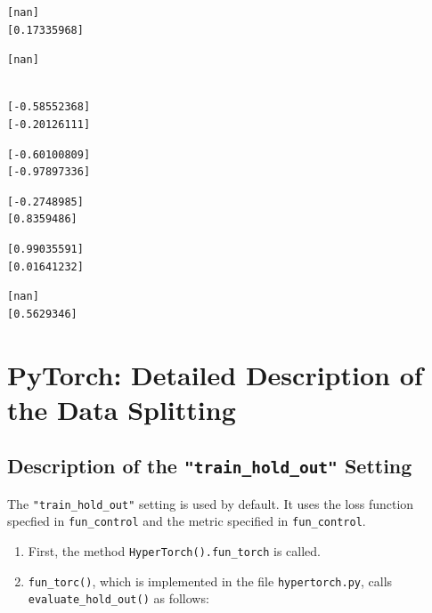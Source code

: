 \documentclass[
  letterpaper,
  DIV=11,
  numbers=noendperiod]{scrreprt}
\providecommand{\tightlist}{%
  \setlength{\itemsep}{0pt}\setlength{\parskip}{0pt}}\usepackage{longtable,booktabs,array}
\begin{document}
\begin{verbatim}
\end{verbatim}

\begin{verbatim}
[nan]
[0.17335968]
\end{verbatim}

\begin{verbatim}
[nan]
\end{verbatim}

\begin{verbatim}

[-0.58552368]
[-0.20126111]
\end{verbatim}

\begin{verbatim}
[-0.60100809]
[-0.97897336]
\end{verbatim}

\begin{verbatim}
[-0.2748985]
[0.8359486]
\end{verbatim}

\begin{verbatim}
[0.99035591]
[0.01641232]
\end{verbatim}

\begin{verbatim}
[nan]
[0.5629346]
\end{verbatim}

\newpage{}

\hypertarget{sec-detailed-data-splitting}{%
\section{PyTorch: Detailed Description of the Data
Splitting}\label{sec-detailed-data-splitting}}

\hypertarget{description-of-the-train_hold_out-setting}{%
\subsection{\texorpdfstring{Description of the
\texttt{"train\_hold\_out"}
Setting}{Description of the "train\_hold\_out" Setting}}\label{description-of-the-train_hold_out-setting}}

The \texttt{"train\_hold\_out"} setting is used by default. It uses the
loss function specfied in \texttt{fun\_control} and the metric specified
in \texttt{fun\_control}.

\begin{enumerate}
\def\labelenumi{\arabic{enumi}.}
\tightlist
\item
  First, the method \texttt{HyperTorch().fun\_torch} is called.
\item
  \texttt{fun\_torc()}, which is implemented in the file
  \texttt{hypertorch.py}, calls \texttt{evaluate\_hold\_out()} as
  follows:
\end{enumerate}
\end{document}
